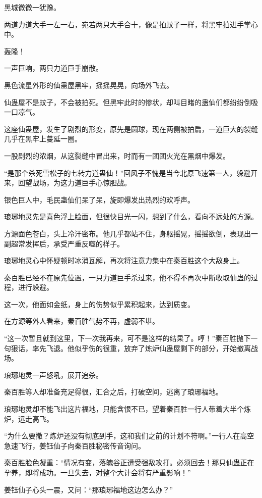 \begin{this_body}
黑城微微一犹豫。

两道力道大手一左一右，宛若两只大手合十，像是拍蚊子一样，将黑牢拍进手掌心中。

轰隆！

一声巨响，两只力道巨手崩散。

黑色流星外形的仙蛊屋黑牢，摇摇晃晃，向场外飞去。

仙蛊屋不是蚊子，不会被拍死。但黑牢此时的惨状，却叫目睹的蛊仙们都纷纷倒吸一口凉气。

这座仙蛊屋，发生了剧烈的形变，原先是圆球，现在两侧被拍扁，一道巨大的裂缝几乎在黑牢上蔓延一圈。

一股剧烈的浓烟，从这裂缝中冒出来，时而有一团团火光在黑烟中爆发。

“是那个杀死雪松子的七转力道蛊仙！”回风子不愧是当今北原飞速第一人，躲避开来，回望战场，为这力道巨手心惊胆战。

银色巨人中，毛民蛊仙们呆了呆，旋即爆发出热烈的欢呼声。

琅琊地灵先是喜色浮上脸面，但很快目光一闪，想到了什么，看向不远处的方源。

方源面色苍白，头上冷汗密布。他几乎都站不住，身躯摇晃，摇摇欲倒，表现出一副超常发挥后，承受严重反噬的样子。

琅琊地灵心中怀疑顿时冰消瓦解，再次将注意力集中在秦百胜这个大敌身上。

秦百胜已经不在原先位置，一只力道巨手杀过来，他不得不再次中断收取仙蛊的过程，进行躲避。

这一次，他面如金纸，身上的伤势似乎累积起来，达到质变。

在方源等外人看来，秦百胜气势不再，虚弱不堪。

“这一次暂且就到这里，下一次我再来，可不是这样的结果了。哼！”秦百胜抛下一句狠话，率先飞退。他似乎伤的很重，放弃了炼炉仙蛊屋剩下的部分，开始撤离战场。

琅琊地灵一声怒吼，展开追杀。

秦百胜等人却准备充足得很，汇合之后，打破空间，逃离了琅琊福地。

琅琊地灵却不能飞出这片福地，只能含恨不已，望着秦百胜一行人带着大半个炼炉，远走高飞。

“为什么要撤？炼炉还没有彻底到手，这和我们之前的计划不符啊。”一行人在高空急速飞行，姜钰仙子向秦百胜秘密传音询问。

秦百胜脸色凝重：“情况有变，落魄谷正遭受强敌攻打。必须回去！那只仙蛊正在孕养，即将成功。一旦失去，对整个大计会将有严重影响！”

姜钰仙子心头一震，又问：“那琅琊福地这边怎么办？”


\end{this_body}
